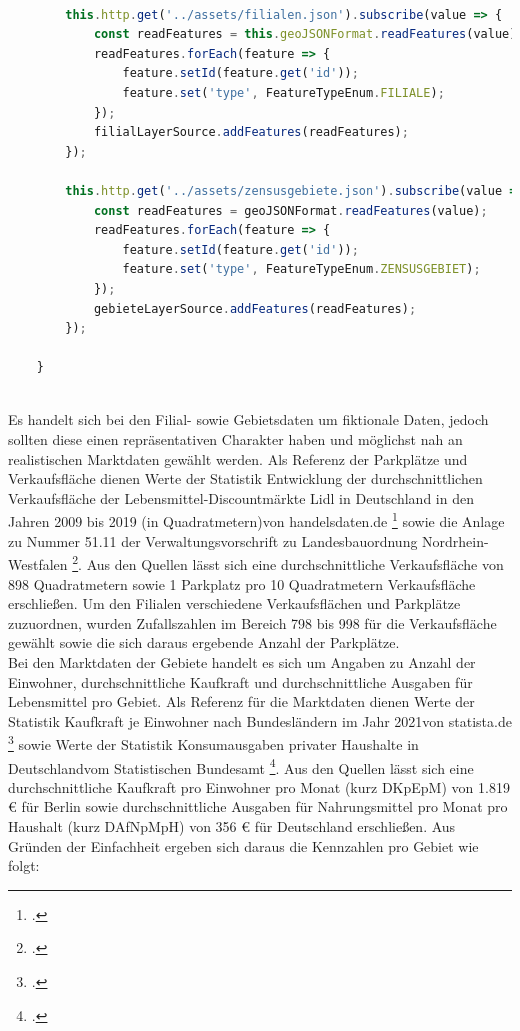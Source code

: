 \begin{lstlisting}[language=JavaScript, caption={Laden der GeoJSON-Dateien der Filialen und Gebiete}]

		this.http.get('../assets/filialen.json').subscribe(value => {
			const readFeatures = this.geoJSONFormat.readFeatures(value);
			readFeatures.forEach(feature => {
				feature.setId(feature.get('id'));
				feature.set('type', FeatureTypeEnum.FILIALE);
			});
			filialLayerSource.addFeatures(readFeatures);
		});

		this.http.get('../assets/zensusgebiete.json').subscribe(value => {
			const readFeatures = geoJSONFormat.readFeatures(value);
			readFeatures.forEach(feature => {
				feature.setId(feature.get('id'));
				feature.set('type', FeatureTypeEnum.ZENSUSGEBIET);
			});
			gebieteLayerSource.addFeatures(readFeatures);
		});
		
	}		
	
\end{lstlisting}

Es handelt sich bei den Filial- sowie Gebietsdaten um fiktionale Daten, jedoch sollten diese einen repräsentativen Charakter haben und möglichst nah an realistischen Marktdaten gewählt werden.
Als Referenz der Parkplätze und Verkaufsfläche dienen Werte der Statistik \glqq Entwicklung der durchschnittlichen Verkaufsfläche der Lebensmittel-Discountmärkte Lidl in Deutschland in den Jahren 2009 bis 2019 (in Quadratmetern)\glqq von handelsdaten.de \footcite{handelsdaten_lidl} sowie die Anlage zu Nummer 51.11 der Verwaltungsvorschrift zu Landesbauordnung Nordrhein-Westfalen \footcite{bauo_5111}.
Aus den Quellen lässt sich eine durchschnittliche Verkaufsfläche von 898 Quadratmetern sowie 1 Parkplatz pro 10 Quadratmetern Verkaufsfläche erschließen.
Um den Filialen verschiedene Verkaufsflächen und Parkplätze zuzuordnen, wurden Zufallszahlen im Bereich 798 bis 998 für die Verkaufsfläche gewählt sowie die sich daraus ergebende Anzahl der Parkplätze.\\
Bei den Marktdaten der Gebiete handelt es sich um Angaben zu Anzahl der Einwohner, durchschnittliche Kaufkraft und durchschnittliche Ausgaben für Lebensmittel pro Gebiet.
Als Referenz für die Marktdaten dienen Werte der Statistik \glqq Kaufkraft je Einwohner nach Bundesländern im Jahr 2021\glqq von statista.de \footcite{statista_gfk} sowie Werte der Statistik \glqq Konsumausgaben privater Haushalte in Deutschland\glqq vom Statistischen Bundesamt \footcite{destatis_konsumausgaben}.
Aus den Quellen lässt sich eine durchschnittliche Kaufkraft pro Einwohner pro Monat (kurz DKpEpM) von 1.819 € für Berlin sowie durchschnittliche Ausgaben für Nahrungsmittel pro Monat pro Haushalt (kurz DAfNpMpH) von 356 € für Deutschland erschließen. 
Aus Gründen der Einfachheit ergeben sich daraus die Kennzahlen pro Gebiet wie folgt:

